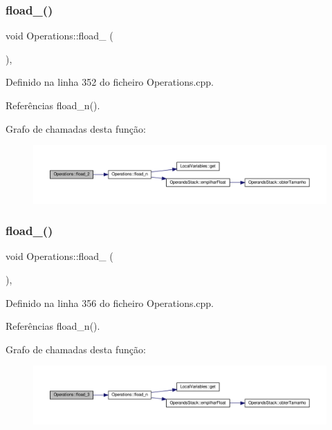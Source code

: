 \subsubsection{\texorpdfstring{fload\+\_()}{fload\_2()}}
{\footnotesize\ttfamily void Operations\+::fload\+\_ (\begin{DoxyParamCaption}{ }\end{DoxyParamCaption})\hspace{0.3cm}{\ttfamily [static]}, {\ttfamily [private]}}



Definido na linha 352 do ficheiro Operations.\+cpp.



Referências fload\+\_\+n().

Grafo de chamadas desta função\+:\nopagebreak
\begin{figure}[H]
\begin{center}
\leavevmode
\includegraphics[width=350pt]{classOperations_a1d1767084d543ab73c8417efe11e195e_cgraph}
\end{center}
\end{figure}
\mbox{\label{classOperations_a1d7d4685fea35e0619ff468ed57a4f94}} 
\subsubsection{\texorpdfstring{fload\+\_()}{fload\_3()}}
{\footnotesize\ttfamily void Operations\+::fload\+\_ (\begin{DoxyParamCaption}{ }\end{DoxyParamCaption})\hspace{0.3cm}{\ttfamily [static]}, {\ttfamily [private]}}



Definido na linha 356 do ficheiro Operations.\+cpp.



Referências fload\+\_\+n().

Grafo de chamadas desta função\+:\nopagebreak
\begin{figure}[H]
\begin{center}
\leavevmode
\includegraphics[width=350pt]{classOperations_a1d7d4685fea35e0619ff468ed57a4f94_cgraph}
\end{center}
\end{figure}
\mbox{\label{classOperations_af466511fbbf8fd71f6dd31b0433df181}} 
